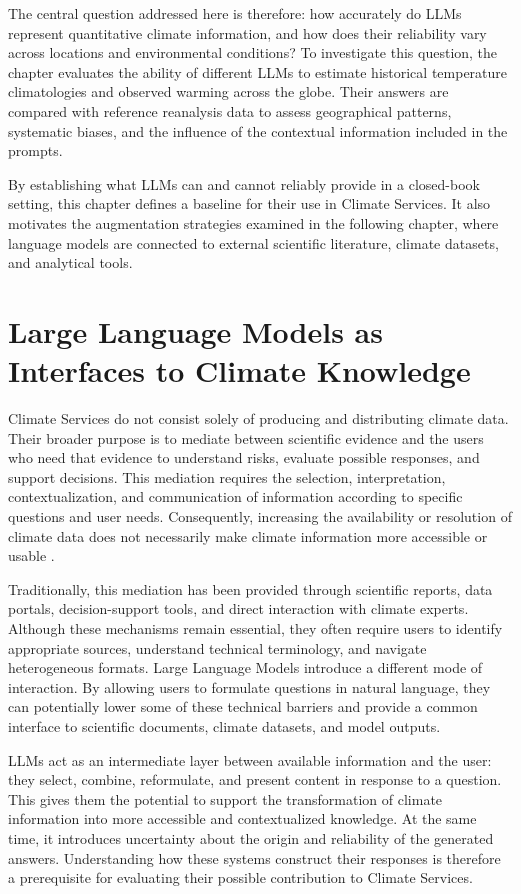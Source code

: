 The central question addressed here is therefore: how accurately do LLMs represent quantitative climate information, and how does their reliability vary across locations and environmental conditions? To investigate this question, the chapter evaluates the ability of different LLMs to estimate historical temperature climatologies and observed warming across the globe. Their answers are compared with reference reanalysis data to assess geographical patterns, systematic biases, and the influence of the contextual information included in the prompts.

By establishing what LLMs can and cannot reliably provide in a closed-book setting, this chapter defines a baseline for their use in Climate Services. It also motivates the augmentation strategies examined in the following chapter, where language models are connected to external scientific literature, climate datasets, and analytical tools.

\section{Large Language Models as Interfaces to Climate Knowledge}

Climate Services do not consist solely of producing and distributing climate data. Their broader purpose is to mediate between scientific evidence and the users who need that evidence to understand risks, evaluate possible responses, and support decisions. This mediation requires the selection, interpretation, contextualization, and communication of information according to specific questions and user needs. Consequently, increasing the availability or resolution of climate data does not necessarily make climate information more accessible or usable \citep{findlater_climate_2021,doblas-reyes_linking_2021}.

Traditionally, this mediation has been provided through scientific reports, data portals, decision-support tools, and direct interaction with climate experts. Although these mechanisms remain essential, they often require users to identify appropriate sources, understand technical terminology, and navigate heterogeneous formats. Large Language Models introduce a different mode of interaction. By allowing users to formulate questions in natural language, they can potentially lower some of these technical barriers and provide a common interface to scientific documents, climate datasets, and model outputs.

LLMs act as an intermediate layer between available information and the user: they select, combine, reformulate, and present content in response to a question. This gives them the potential to support the transformation of climate information into more accessible and contextualized knowledge. At the same time, it introduces uncertainty about the origin and reliability of the generated answers. Understanding how these systems construct their responses is therefore a prerequisite for evaluating their possible contribution to Climate Services.



